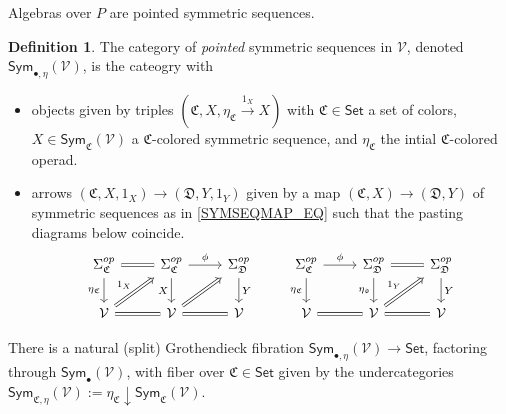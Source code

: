 \documentclass[a4paper,10pt
,draft
]{article}%
\numberwithin{equation}{section}
\numberwithin{figure}{section}
\theoremstyle{definition} %
\newtheorem{definition}[equation]{Definition}%
\newcommand{\Sym}{\ensuremath{\mathsf{Sym}}}%
\newcommand{\Set}{\ensuremath{\mathsf{Set}}}
\newcommand{\V}{\ensuremath{\mathcal V}}
\newcommand{\1}{\ensuremath{\mathbbm 1}}%
\begin{document}
Algebras over $P$ are pointed symmetric sequences.
\begin{definition}
      The category of \textit{pointed} symmetric sequences in $\V$, denoted $\Sym_{\bullet,\eta}(\V)$, is the cateogry with
      \begin{itemize}
      \item objects given by triples $(\mathfrak C, X, \eta_{\mathfrak C} \xrightarrow{1_X} X)$ with
            $\mathfrak C \in \Set$ a set of colors, $X \in \Sym_{\mathfrak C}(\V)$ a $\mathfrak C$-colored symmetric sequence, and
            $\eta_{\mathfrak C}$ the intial $\mathfrak C$-colored operad.
      \item arrows $(\mathfrak C, X, 1_X) \to (\mathfrak D, Y, 1_Y)$ given by
            a map $(\mathfrak C, X) \to (\mathfrak D, Y)$ of symmetric sequences as in \eqref{SYMSEQMAP_EQ} such that
            the pasting diagrams below coincide.
            \[
                  \begin{tikzcd}
                        \Sigma_{\mathfrak C}^{op} \arrow[d, "\eta_{\mathfrak C}"'] \arrow[r, equal]
                        &
                        \Sigma_{\mathfrak C}^{op} \arrow[d, "X"'] \arrow[r, "\phi"]
                        &
                        \Sigma_{\mathfrak D}^{op} \arrow[d, "Y"]
                        & %
                        \Sigma_{\mathfrak C}^{op} \arrow[d, "\eta_{\mathfrak C}"'] \arrow[r, "\phi"]
                        &
                        \Sigma_{\mathfrak D}^{op} \arrow[d, "\eta_{\mathfrak d}"'] \arrow[r, equal]
                        &
                        \Sigma_{\mathfrak D}^{op} \arrow[d, "Y"]
                        \\
                        \V \arrow[r, equal] \arrow[ur, Rightarrow, "1_X"]
                        &
                        \V \arrow[r, equal] \arrow[ur, Rightarrow]
                        &
                        \V
                        & %
                        \V \arrow[r, equal]
                        &
                        \V \arrow[r, equal] \arrow[ur, Rightarrow, "1_Y"]
                        &
                        \V
                  \end{tikzcd}
            \]
      \end{itemize}

      There is a natural (split) Grothendieck fibration $\Sym_{\bullet,\eta}(\V) \to \Set$, factoring through $\Sym_\bullet(\V)$,
      with fiber over $\mathfrak C \in \Set$ given by
      the undercategories $\Sym_{\mathfrak C, \eta}(\V) := \eta_{\mathfrak C} \downarrow \Sym_{\mathfrak C}(\V)$.
\end{definition}
\end{document}
